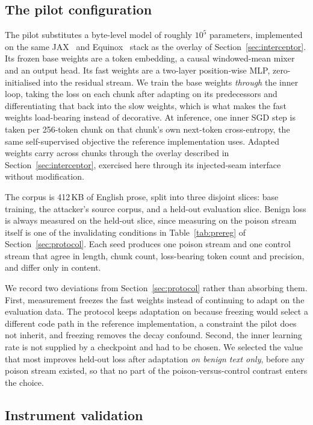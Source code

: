 \documentclass[journal]{IEEEtran}
\begin{document}
\subsection{The pilot configuration}

The pilot substitutes a byte-level model of roughly $10^5$ parameters,
implemented on the same JAX~\cite{bradbury2018jax} and
Equinox~\cite{kidger2021equinox} stack as the overlay of
Section~\ref{sec:interceptor}. Its frozen base weights are a token embedding, a
causal windowed-mean mixer and an output head. Its fast weights are a two-layer
position-wise MLP, zero-initialised into the residual stream. We train the base
weights \emph{through} the inner loop, taking the loss on each chunk after
adapting on its predecessors and differentiating that back into the slow weights,
which is what makes the fast weights load-bearing instead of decorative. At
inference, one inner SGD step is taken per 256-token chunk on that chunk's own
next-token cross-entropy, the same self-supervised objective the reference
implementation uses. Adapted weights carry across chunks through the overlay
described in Section~\ref{sec:interceptor}, exercised here through its
injected-seam interface without modification.

The corpus is 412\,KB of English prose, split into three disjoint slices: base
training, the attacker's source corpus, and a held-out evaluation slice. Benign
loss is always measured on the held-out slice, since measuring on the poison
stream itself is one of the invalidating conditions in Table~\ref{tab:prereg} of
Section~\ref{sec:protocol}. Each seed produces one poison stream and one control
stream that agree in length, chunk count, loss-bearing token count and precision,
and differ only in content.

We record two deviations from Section~\ref{sec:protocol} rather than absorbing
them. First, measurement freezes the fast weights instead of continuing to adapt
on the evaluation data. The protocol keeps adaptation on because freezing would
select a different code path in the reference implementation, a constraint the
pilot does not inherit, and freezing removes the decay confound. Second, the
inner learning rate is not supplied by a checkpoint and had to be chosen. We
selected the value that most improves held-out loss after adaptation \emph{on
benign text only}, before any poison stream existed, so that no part of the
poison-versus-control contrast enters the choice.

\subsection{Instrument validation}
\end{document}

